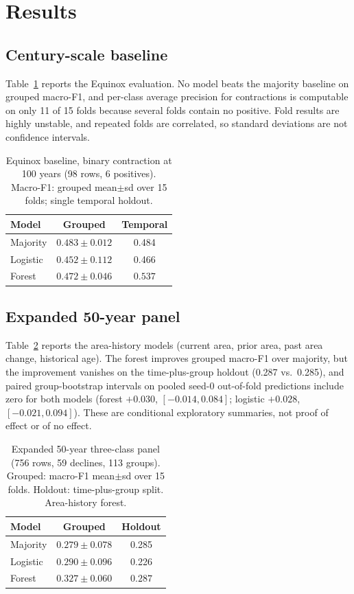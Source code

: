 \documentclass[conference]{IEEEtran}
\begin{document}
\section{Results}
\subsection{Century-scale baseline}
Table~\ref{tab:equinox} reports the Equinox evaluation. No model beats the
majority baseline on grouped macro-F1, and per-class average precision for
contractions is computable on only 11 of 15 folds because several folds contain no
positive. Fold results are highly unstable, and repeated folds are correlated, so
standard deviations are not confidence intervals.

\begin{table}[t]
\centering
\caption{Equinox baseline, binary contraction at 100 years (98 rows, 6
positives). Macro-F1: grouped mean$\pm$sd over 15 folds; single temporal
holdout.}
\label{tab:equinox}
\begin{tabular}{lcc}
\hline\hline
Model & Grouped & Temporal \\
\hline
Majority & $\mathbf{0.483 \pm 0.012}$ & 0.484 \\
Logistic & $0.452 \pm 0.112$ & 0.466 \\
Forest & $0.472 \pm 0.046$ & $\mathbf{0.537}$ \\
\hline\hline
\end{tabular}
\end{table}

\subsection{Expanded 50-year panel}
Table~\ref{tab:fifty} reports the area-history models (current area, prior area,
past area change, historical age). The forest improves grouped macro-F1 over
majority, but the improvement vanishes on the time-plus-group holdout
(0.287 vs.\ 0.285), and paired group-bootstrap intervals on pooled seed-0
out-of-fold predictions include zero for both models (forest $+0.030$,
$[-0.014, 0.084]$; logistic $+0.028$, $[-0.021, 0.094]$). These are conditional
exploratory summaries, not proof of effect or of no effect.

\begin{table}[t]
\centering
\caption{Expanded 50-year three-class panel (756 rows, 59 declines, 113
groups). Grouped: macro-F1 mean$\pm$sd over 15 folds. Holdout: time-plus-group
split. Area-history forest.}
\label{tab:fifty}
\begin{tabular}{lcc}
\hline\hline
Model & Grouped & Holdout \\
\hline
Majority & $0.279 \pm 0.078$ & 0.285 \\
Logistic & $0.290 \pm 0.096$ & 0.226 \\
Forest & $\mathbf{0.327 \pm 0.060}$ & $\mathbf{0.287}$ \\
\hline\hline
\end{tabular}
\end{table}
\end{document}
